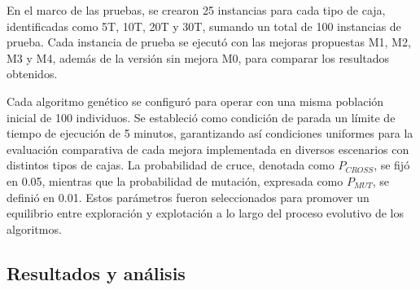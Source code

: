 En el marco de las pruebas, se crearon 25 instancias para cada tipo de caja, identificadas como 5T, 10T, 20T y 30T, sumando un total de 100 instancias de prueba. Cada instancia de prueba se ejecutó con las mejoras propuestas M1, M2, M3 y M4, además de la versión sin mejora M0, para comparar los resultados obtenidos.

Cada algoritmo genético se configuró para operar con una misma población inicial de 100 individuos. Se estableció como condición de parada un límite de tiempo de ejecución de 5 minutos, garantizando así condiciones uniformes para la evaluación comparativa de cada mejora implementada en diversos escenarios con distintos tipos de cajas. La probabilidad de cruce, denotada como $P_{CROSS}$, se fijó en 0.05, mientras que la probabilidad de mutación, expresada como $P_{MUT}$, se definió en 0.01. Estos parámetros fueron seleccionados para promover un equilibrio entre exploración y explotación a lo largo del proceso evolutivo de los algoritmos.

\subsection{Resultados y análisis}